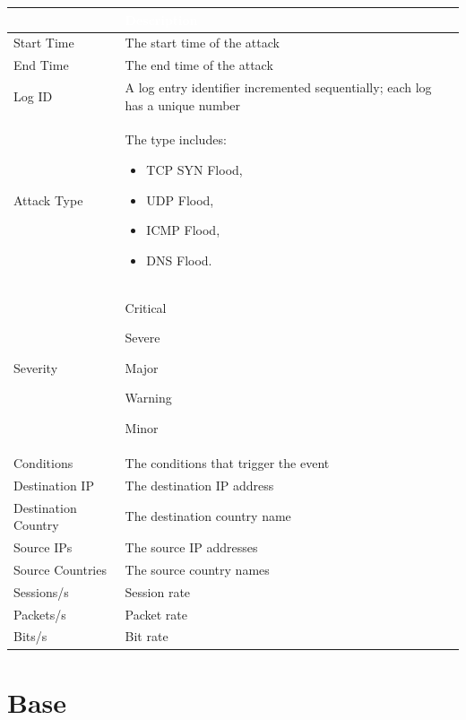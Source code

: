 \begin{longtable}{p{}|p{}}   
    \rowcolor{black}\multicolumn{1}{l!\vlinewhite}{\textcolor{white}{Field}}  & \textcolor{white}{Description} \\\hline  
    Start Time &	The start time of the attack \\\hline
    End Time &	The end time of the attack\\\hline
    Log ID &	A log entry identifier incremented sequentially; each log has a unique number\\\hline
    Attack Type &	The type includes:
                    \begin{itemize}                
                    \item TCP SYN Flood,
                    \item UDP Flood,
                    \item ICMP Flood,
                    \item DNS Flood.
                    \end{itemize} \\\hline
    Severity &	Critical
                
    
                Severe
                
                
                Major
                
                
                Warning
                
                
                Minor\\\hline
    Conditions &	The conditions that trigger the event\\\hline
    Destination IP &	The destination IP address\\\hline
    Destination Country	 & The destination country name\\\hline
    Source IPs &	The source IP addresses\\\hline
    Source Countries &	The source country names\\\hline
    Sessions/s &	Session rate\\\hline
    Packets/s &	Packet rate\\\hline
    Bits/s &	Bit rate\\\hline
\end{longtable}
\section*{\hypertarget{link:Base}{Base}}
\label{sec:appendix_c:base}

